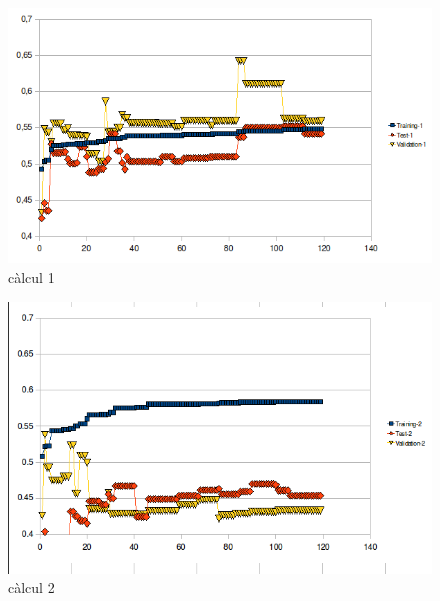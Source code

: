 \begin{figure}[h] \begin{center}
\includegraphics[scale=0.75]{pholus/pholus1.png}
\end{center}
\caption{càlcul 1}
\label{fig:pholusResult1}
\end{figure}

\begin{figure}[h]
\begin{center}
\includegraphics[scale=0.75]{pholus/pholus2.png}
\end{center}
\caption{càlcul 2}
\label{fig:pholusResult2}
\end{figure}

